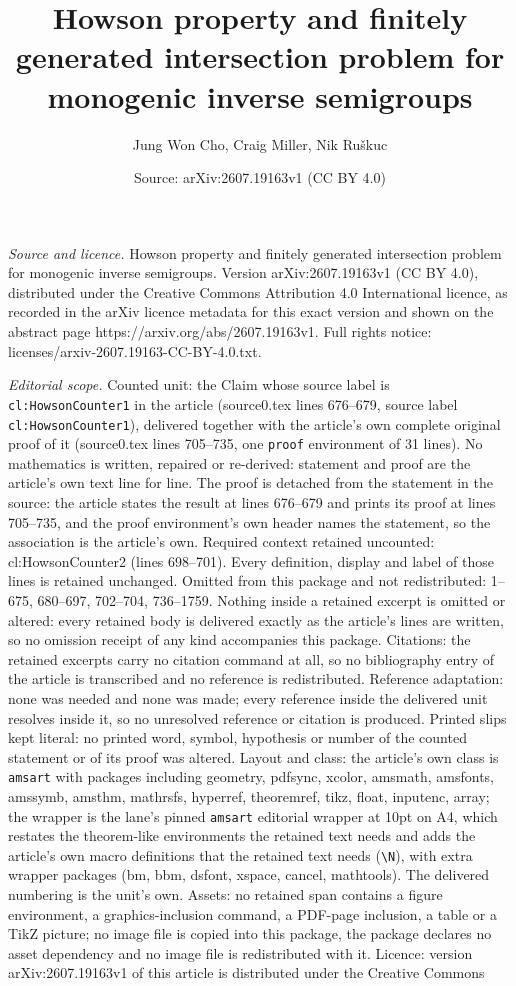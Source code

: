 \documentclass[10pt,a4paper]{amsart}
\title[Howson property and finitely generated intersection problem ]{Howson property and finitely generated intersection problem for monogenic inverse semigroups}
\author{Jung Won Cho, Craig Miller, Nik Ru\v{s}kuc}
\date{Source: arXiv:2607.19163v1 (CC BY 4.0)}
\begin{document}
\maketitle

\noindent\emph{Source and licence.} Howson property and finitely generated intersection problem for monogenic inverse semigroups. Version arXiv:2607.19163v1 (CC BY 4.0), distributed under the Creative Commons Attribution 4.0 International licence, as recorded in the arXiv licence metadata for this exact version and shown on the abstract page https://arxiv.org/abs/2607.19163v1. Full rights notice: licenses/arxiv-2607.19163-CC-BY-4.0.txt.\par\smallskip

\noindent\textit{Editorial scope.} Counted unit: the Claim whose source label is \texttt{cl:HowsonCounter1} in the article (source0.tex lines 676--679, source label \texttt{cl:HowsonCounter1}), delivered together with the article's own complete original proof of it (source0.tex lines 705--735, one \texttt{proof} environment of 31 lines). No mathematics is written, repaired or re-derived: statement and proof are the article's own text line for line. The proof is detached from the statement in the source: the article states the result at lines 676--679 and prints its proof at lines 705--735, and the proof environment's own header names the statement, so the association is the article's own. Required context retained uncounted: cl:HowsonCounter2 (lines 698--701). Every definition, display and label of those lines is retained unchanged. Omitted from this package and not redistributed: 1--675, 680--697, 702--704, 736--1759. Nothing inside a retained excerpt is omitted or altered: every retained body is delivered exactly as the article's lines are written, so no omission receipt of any kind accompanies this package. Citations: the retained excerpts carry no citation command at all, so no bibliography entry of the article is transcribed and no reference is redistributed. Reference adaptation: none was needed and none was made; every reference inside the delivered unit resolves inside it, so no unresolved reference or citation is produced. Printed slips kept literal: no printed word, symbol, hypothesis or number of the counted statement or of its proof was altered. Layout and class: the article's own class is \texttt{amsart} with packages including geometry, pdfsync, xcolor, amsmath, amsfonts, amssymb, amsthm, mathrsfs, hyperref, theoremref, tikz, float, inputenc, array; the wrapper is the lane's pinned \texttt{amsart} editorial wrapper at 10pt on A4, which restates the theorem-like environments the retained text needs and adds the article's own macro definitions that the retained text needs (\texttt{\textbackslash N}), with extra wrapper packages (bm, bbm, dsfont, xspace, cancel, mathtools). The delivered numbering is the unit's own. Assets: no retained span contains a figure environment, a graphics-inclusion command, a PDF-page inclusion, a table or a TikZ picture; no image file is copied into this package, the package declares no asset dependency and no image file is redistributed with it. Licence: version arXiv:2607.19163v1 of this article is distributed under the Creative Commons 
\end{document}
